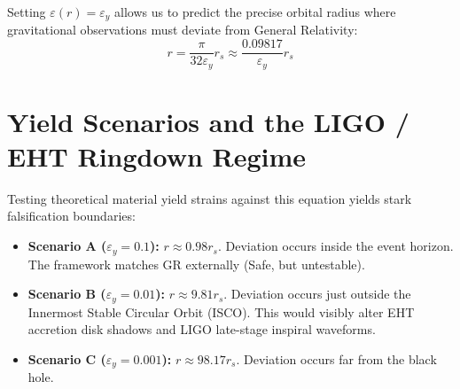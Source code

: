 \documentclass[11pt, letterpaper, openany]{book}
\begin{document}
Setting $\varepsilon(r) = \varepsilon_y$ allows us to predict the precise orbital radius where gravitational observations must deviate from General Relativity:
\[
r = \frac{\pi}{32 \varepsilon_y} r_s \approx \frac{0.09817}{\varepsilon_y} r_s
\]

\vspace{0.3cm}
\begin{center}
\end{center}
\vspace{0.3cm}

\section{Yield Scenarios and the LIGO / EHT Ringdown Regime}

Testing theoretical material yield strains against this equation yields stark falsification boundaries:
\begin{itemize}
    \item \textbf{Scenario A ($\varepsilon_y = 0.1$):} $r \approx 0.98 r_s$. Deviation occurs inside the event horizon. The framework matches GR externally (Safe, but untestable).
    \item \textbf{Scenario B ($\varepsilon_y = 0.01$):} $r \approx 9.81 r_s$. Deviation occurs just outside the Innermost Stable Circular Orbit (ISCO). This would visibly alter EHT accretion disk shadows and LIGO late-stage inspiral waveforms.
    \item \textbf{Scenario C ($\varepsilon_y = 0.001$):} $r \approx 98.17 r_s$. Deviation occurs far from the black hole. 
\end{itemize}
\end{document}
